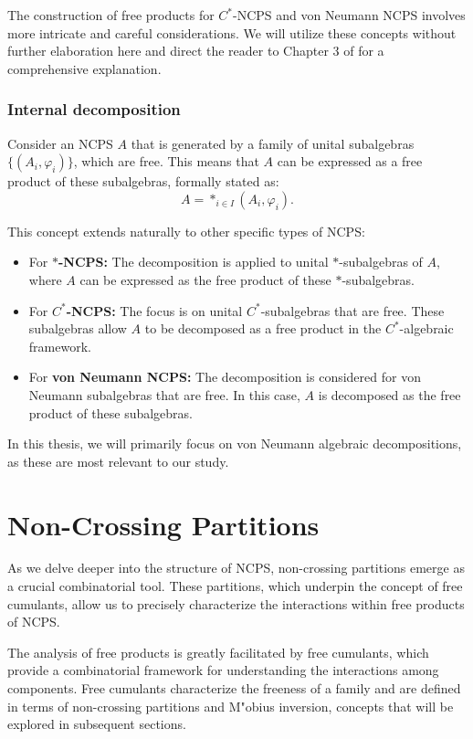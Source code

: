 \begin{remark}
The construction of free products for $C^*$-NCPS and von Neumann NCPS involves more intricate and careful considerations. We will utilize these concepts without further elaboration here and direct the reader to Chapter 3 of \cite{voiculescu1992free} for a comprehensive explanation.
\end{remark}

\subsubsection{Internal decomposition}

Consider an NCPS $A$ that is generated by a family of unital subalgebras $\{(A_i, \varphi_i)\}$, which are free. This means that $A$ can be expressed as a free product of these subalgebras, formally stated as:
\[
A = *_{i\in I} (A_i,\varphi_i).
\]

This concept extends naturally to other specific types of NCPS:
\begin{itemize}
    \item For \textbf{$*$-NCPS:} The decomposition is applied to unital $*$-subalgebras of $A$, where $A$ can be expressed as the free product of these $*$-subalgebras.
    \item For \textbf{$C^*$-NCPS:} The focus is on  unital $C^*$-subalgebras that are free. These subalgebras allow $A$ to be decomposed as a free product in the $C^*$-algebraic framework.
    \item For \textbf{von Neumann NCPS:} The decomposition is considered for von Neumann subalgebras that are free. In this case, $A$ is decomposed as the free product of these subalgebras.
\end{itemize}

In this thesis, we will primarily focus on von Neumann algebraic decompositions, as these are most relevant to our study.


\section{Non-Crossing Partitions}\label{sec:NC-partition}

As we delve deeper into the structure of NCPS, non-crossing partitions emerge as a crucial combinatorial tool. These partitions, which underpin the concept of free cumulants, allow us to precisely characterize the interactions within free products of NCPS.

The analysis of free products is greatly facilitated by free cumulants, which provide a combinatorial framework for understanding the interactions among components. Free cumulants characterize the freeness of a family and are defined in terms of non-crossing partitions and M"{o}bius inversion, concepts that will be explored in subsequent sections.

